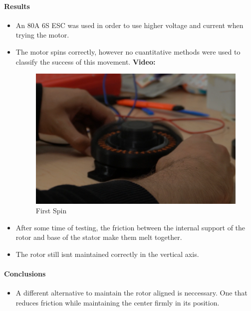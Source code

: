 \documentclass{article}
\begin{document}
\paragraph{Results}
\begin{itemize}
    \item An 80A 6S ESC was used in order to use higher voltage and current when trying the motor. 
    \item The motor spins correctly, however no cuantitative methods were used to classify the success of this movement.
    \textbf{Video: }

    \begin{figure}[H]
        \centering
        \includegraphics[width=\linewidth]{Images/Motor/FirstSpin.png}
        \caption{First Spin}
    \end{figure}
    
    \item After some time of testing, the friction between the internal support of the rotor and base of the stator make them melt together.
    \item The rotor still isnt maintained correctly in the vertical axis.
\end{itemize}
\paragraph{Conclusions}
\begin{itemize}
    \item A different alternative to maintain the rotor aligned is neccessary. One that reduces friction while maintaining the center firmly in its position.
\end{itemize}
\end{document}

